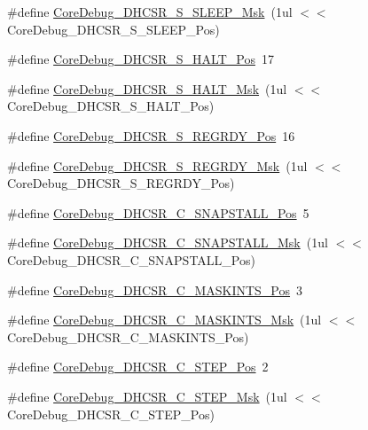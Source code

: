 \begin{DoxyCompactItemize}
\#define \hyperlink{group__CMSIS__CM3__CoreDebug_ga98d51538e645c2c1a422279cd85a0a25}{Core\+Debug\+\_\+\+D\+H\+C\+S\+R\+\_\+\+S\+\_\+\+S\+L\+E\+E\+P\+\_\+\+Msk}~(1ul $<$$<$ Core\+Debug\+\_\+\+D\+H\+C\+S\+R\+\_\+\+S\+\_\+\+S\+L\+E\+E\+P\+\_\+\+Pos)
\item 
\#define \hyperlink{group__CMSIS__CM3__CoreDebug_ga760a9a0d7f39951dc3f07d01f1f64772}{Core\+Debug\+\_\+\+D\+H\+C\+S\+R\+\_\+\+S\+\_\+\+H\+A\+L\+T\+\_\+\+Pos}~17
\item 
\#define \hyperlink{group__CMSIS__CM3__CoreDebug_ga9f881ade3151a73bc5b02b73fe6473ca}{Core\+Debug\+\_\+\+D\+H\+C\+S\+R\+\_\+\+S\+\_\+\+H\+A\+L\+T\+\_\+\+Msk}~(1ul $<$$<$ Core\+Debug\+\_\+\+D\+H\+C\+S\+R\+\_\+\+S\+\_\+\+H\+A\+L\+T\+\_\+\+Pos)
\item 
\#define \hyperlink{group__CMSIS__CM3__CoreDebug_ga20a71871ca8768019c51168c70c3f41d}{Core\+Debug\+\_\+\+D\+H\+C\+S\+R\+\_\+\+S\+\_\+\+R\+E\+G\+R\+D\+Y\+\_\+\+Pos}~16
\item 
\#define \hyperlink{group__CMSIS__CM3__CoreDebug_gac4cd6f3178de48f473d8903e8c847c07}{Core\+Debug\+\_\+\+D\+H\+C\+S\+R\+\_\+\+S\+\_\+\+R\+E\+G\+R\+D\+Y\+\_\+\+Msk}~(1ul $<$$<$ Core\+Debug\+\_\+\+D\+H\+C\+S\+R\+\_\+\+S\+\_\+\+R\+E\+G\+R\+D\+Y\+\_\+\+Pos)
\item 
\#define \hyperlink{group__CMSIS__CM3__CoreDebug_ga85747214e2656df6b05ec72e4d22bd6d}{Core\+Debug\+\_\+\+D\+H\+C\+S\+R\+\_\+\+C\+\_\+\+S\+N\+A\+P\+S\+T\+A\+L\+L\+\_\+\+Pos}~5
\item 
\#define \hyperlink{group__CMSIS__CM3__CoreDebug_ga53aa99b2e39a67622f3b9973e079c2b4}{Core\+Debug\+\_\+\+D\+H\+C\+S\+R\+\_\+\+C\+\_\+\+S\+N\+A\+P\+S\+T\+A\+L\+L\+\_\+\+Msk}~(1ul $<$$<$ Core\+Debug\+\_\+\+D\+H\+C\+S\+R\+\_\+\+C\+\_\+\+S\+N\+A\+P\+S\+T\+A\+L\+L\+\_\+\+Pos)
\item 
\#define \hyperlink{group__CMSIS__CM3__CoreDebug_ga0d2907400eb948a4ea3886ca083ec8e3}{Core\+Debug\+\_\+\+D\+H\+C\+S\+R\+\_\+\+C\+\_\+\+M\+A\+S\+K\+I\+N\+T\+S\+\_\+\+Pos}~3
\item 
\#define \hyperlink{group__CMSIS__CM3__CoreDebug_ga77fe1ef3c4a729c1c82fb62a94a51c31}{Core\+Debug\+\_\+\+D\+H\+C\+S\+R\+\_\+\+C\+\_\+\+M\+A\+S\+K\+I\+N\+T\+S\+\_\+\+Msk}~(1ul $<$$<$ Core\+Debug\+\_\+\+D\+H\+C\+S\+R\+\_\+\+C\+\_\+\+M\+A\+S\+K\+I\+N\+T\+S\+\_\+\+Pos)
\item 
\#define \hyperlink{group__CMSIS__CM3__CoreDebug_gae1fc39e80de54c0339cbb1b298a9f0f9}{Core\+Debug\+\_\+\+D\+H\+C\+S\+R\+\_\+\+C\+\_\+\+S\+T\+E\+P\+\_\+\+Pos}~2
\item 
\#define \hyperlink{group__CMSIS__CM3__CoreDebug_gae6bda72fbd32cc5734ff3542170dc00d}{Core\+Debug\+\_\+\+D\+H\+C\+S\+R\+\_\+\+C\+\_\+\+S\+T\+E\+P\+\_\+\+Msk}~(1ul $<$$<$ Core\+Debug\+\_\+\+D\+H\+C\+S\+R\+\_\+\+C\+\_\+\+S\+T\+E\+P\+\_\+\+Pos)

\end{DoxyCompactItemize}
